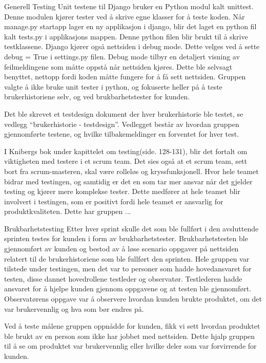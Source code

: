 \documentclass[12pt,a4paper,norsk]{article}
\begin{document}
Generell Testing
Unit testene til Django bruker en Python modul kalt unittest. Denne modulen kjører tester ved å skrive egne klasser for å teste koden. Når manage.py startapp lager en ny applikasjon i django, blir det laget en python fil kalt tests.py i applikasjons mappen. Denne python filen blir brukt til å skrive testklassene. Django kjører også nettsiden i debug mode. Dette velges ved å sette debug = True i settings.py filen. Debug mode tilbyr en detaljert visning av feilmeldingene som måtte oppstå når nettsiden kjøres. Dette ble selvsagt benyttet, nettopp fordi koden måtte fungere for å få sett nettsiden. Gruppen valgte å ikke bruke unit tester i python, og fokuserte heller på å teste brukerhistoriene selv, og ved brukbarhetstester for kunden.

Det ble skrevet et testdesign dokument der hver brukerhistorie ble testet, se vedlegg “brukerhistorie - testdesign”. Vedlegget består av hvordan gruppen gjennomførte testene, og hvilke tilbakemeldinger en forventet for hver test.

I Knibergs bok under kapittelet om testing(side. 128-131), blir det fortalt om viktigheten med testere i et scrum team. Det sies også at et scrum team, sett bort fra scrum-masteren, skal være rolleløs og kryssfunksjonell. Hvor hele teamet bidrar med testingen, og samtidig er det en som tar mer ansvar når det gjelder testing og kjører mere komplekse tester. Dette medfører at hele teamet blir involvert i testingen, som er positivt fordi hele teamet er ansvarlig for produktkvaliteten.
Dette har gruppen ...

Brukbarhetstesting
Etter hver sprint skulle det som ble fullført i den avsluttende sprinten testes for kunden i form av brukbarhetstester. Brukbarhetstesten ble gjennomført av kunden og bestod av å løse scenario oppgaver på nettsiden relatert til de brukerhistoriene som ble fullført den sprinten. Hele gruppen var tilstede under testingen, men det var to personer som hadde hovedansvaret for testen, disse dannet hovedrollene testleder og observatør. Testlederen hadde ansvaret for å hjelpe kunden gjennom oppgavene og at testen ble gjennomført. Observatørens oppgave var å observere hvordan kunden brukte produktet, om det var brukervennlig og hva som bør endres på.

Ved å teste målene gruppen oppnådde for kunden, fikk vi sett hvordan produktet ble brukt av en person som ikke har jobbet med nettsiden. Dette hjalp gruppen til å se om produktet var brukervennlig eller hvilke deler som var forvirrende for kunden. 
\end{document}
